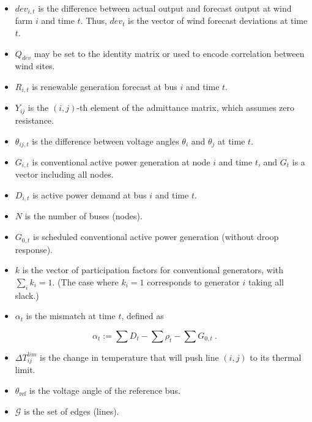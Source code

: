 \documentclass[conference]{IEEEtran}
\begin{document}
\begin{itemize}
\itemsep1pt\parskip0pt
\item $dev_{i,t}$ is the difference between actual output and forecast output at wind farm $i$ and time $t$. Thus, $dev_t$ is the vector of wind forecast deviations at time $t$.
\item $Q_{dev}$ may be set to the identity matrix or used to encode correlation between wind sites.
\item $R_{i,t}$ is renewable generation forecast at bus $i$ and time $t$.
\item $Y_{ij}$ is the $(i,j)$-th element of the admittance matrix, which assumes zero resistance.
\item $\theta_{ij,t}$ is the difference between voltage angles $\theta_i$ and $\theta_j$ at time $t$.
\item $G_{i,t}$ is conventional active power generation at node $i$ and time $t$, and $G_t$ is a vector including all nodes.
\item $D_{i,t}$ is active power demand at bus $i$ and time $t$.
\item $N$ is the number of buses (nodes).
\item $G_{0,t}$ is scheduled conventional active power generation (without droop response).
\item $k$ is the vector of participation factors for conventional generators, with $\sum_i k_i = 1$. (The case where $k_i=1$ corresponds to generator $i$ taking all slack.)
\item $\alpha_t$ is the mismatch at time $t$, defined as
\end{itemize}
\[\alpha_t:= \sum D_t - \sum \rho_t - \sum G_{0,t} ~.\]

\begin{itemize}
\itemsep1pt\parskip0pt
\item $\Delta T_{ij}^{lim}$ is the change in temperature that will push line $(i,j)$ to its thermal limit.
\item $\theta_\text{ref}$ is the voltage angle of the reference bus.
\item $\mathcal{G}$ is the set of edges (lines).
\end{itemize}
\end{document}
